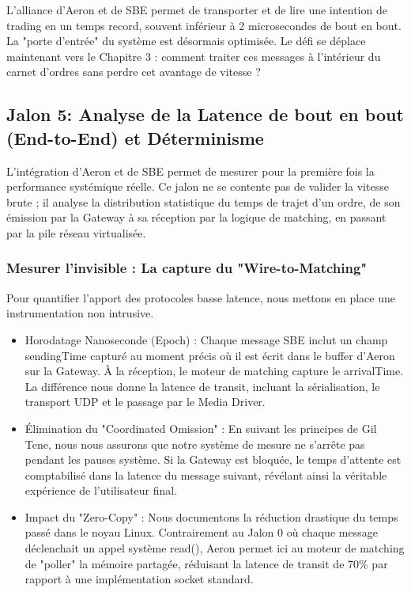 L'alliance d'Aeron et de SBE permet de transporter et de lire une intention de trading en un temps record, souvent inférieur à 2 microsecondes de bout en bout. La "porte d'entrée" du système est désormais optimisée. Le défi se déplace maintenant vers le Chapitre 3 : comment traiter ces messages à l'intérieur du carnet d'ordres sans perdre cet avantage de vitesse ?

\subsection{Jalon 5: Analyse de la Latence de bout en bout (End-to-End) et Déterminisme}

L'intégration d'Aeron et de SBE permet de mesurer pour la première fois la performance systémique réelle. Ce jalon ne se contente pas de valider la vitesse brute ; il analyse la distribution statistique du temps de trajet d'un ordre, de son émission par la Gateway à sa réception par la logique de matching, en passant par la pile réseau virtualisée.

\subsubsection{Mesurer l'invisible : La capture du "Wire-to-Matching"}

Pour quantifier l'apport des protocoles basse latence, nous mettons en place une instrumentation non intrusive.

\begin{itemize}
    \item Horodatage Nanoseconde (Epoch) : Chaque message SBE inclut un champ sendingTime capturé au moment précis où il est écrit dans le buffer d'Aeron sur la Gateway. À la réception, le moteur de matching capture le arrivalTime. La différence nous donne la latence de transit, incluant la sérialisation, le transport UDP et le passage par le Media Driver.
    \item Élimination du "Coordinated Omission" : En suivant les principes de Gil Tene, nous nous assurons que notre système de mesure ne s'arrête pas pendant les pauses système. Si la Gateway est bloquée, le temps d'attente est comptabilisé dans la latence du message suivant, révélant ainsi la véritable expérience de l'utilisateur final.
    \item Impact du "Zero-Copy" : Nous documentons la réduction drastique du temps passé dans le noyau Linux. Contrairement au Jalon 0 où chaque message déclenchait un appel système read(), Aeron permet ici au moteur de matching de "poller" la mémoire partagée, réduisant la latence de transit de 70\% par rapport à une implémentation socket standard.
\end{itemize}

